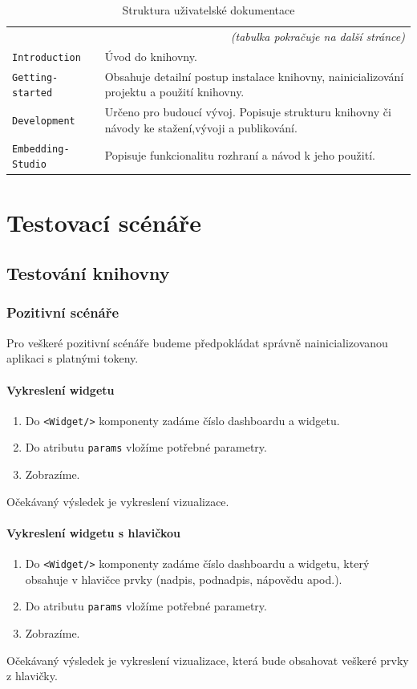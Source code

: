\documentclass[czech, bc, kiv, he, iso690numb]{fasthesis}
\begin{document}
\begin{center}
	\begin{longtable}{p{}p{}}
	\caption{Struktura uživatelské dokumentace}
	\label{tab:docsTabs}\\
	\toprule[1.5pt]
	\endhead
	\midrule
	\multicolumn{2}{r}{\textit{(tabulka pokračuje na další stránce)}}\\
	\endfoot
	\bottomrule[1.5pt]
	\endlastfoot
	\verb"Introduction" & Úvod do knihovny. \\
	\midrule
	\verb"Getting-started" & Obsahuje detailní postup instalace knihovny, nainicializování projektu a použití knihovny. \\
	\midrule
	\verb"Development" & Určeno pro budoucí vývoj. Popisuje strukturu knihovny či návody ke stažení,vývoji a publikování.\\
	\midrule
	\verb"Embedding-Studio" & Popisuje funkcionalitu rozhraní a návod k jeho použití. \\
	\end{longtable}
\end{center}

\chapter{Testovací scénáře}\label{app:testCases}
\section{Testování knihovny}
\subsection{Pozitivní scénáře}
Pro veškeré pozitivní scénáře budeme předpokládat správně nainicializovanou aplikaci s platnými tokeny.
\subsubsection{Vykreslení widgetu}
\begin{enumerate}
	\item Do \texttt{<Widget/>} komponenty zadáme číslo dashboardu a widgetu.
	\item Do atributu \texttt{params} vložíme potřebné parametry.
	\item Zobrazíme.
\end{enumerate}
Očekávaný výsledek je vykreslení vizualizace.

\subsubsection{Vykreslení widgetu s hlavičkou}
\begin{enumerate}
	\item Do \texttt{<Widget/>} komponenty zadáme číslo dashboardu a widgetu, který obsahuje v hlavičce prvky (nadpis, podnadpis, nápovědu apod.).
	\item Do atributu \texttt{params} vložíme potřebné parametry.
	\item Zobrazíme.
\end{enumerate}
Očekávaný výsledek je vykreslení vizualizace, která bude obsahovat veškeré prvky z hlavičky.
\end{document}
